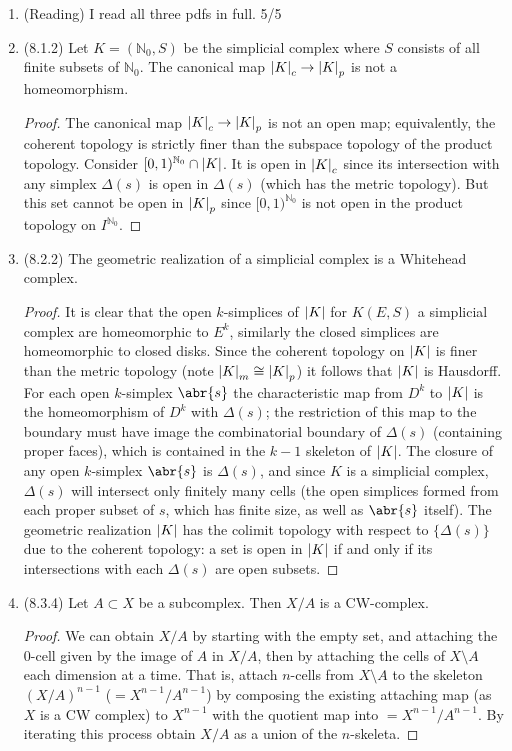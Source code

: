 \documentclass[11pt]{article}
\begin{document}
\begin{enumerate}
    \item (Reading) I read all three pdfs in full. 5/5
    \item (8.1.2) Let $K = (\mathbb{N}_0, S)$ be the simplicial complex where $S$ consists of all finite subsets of $\mathbb{N}_0$. The canonical map $\abs{K}_c\to \abs{K}_p$ is not a homeomorphism. \begin{proof}
      The canonical map $\abs{K}_c\to \abs{K}_p$ is not an open map; equivalently, the coherent topology is strictly finer than the subspace topology of the product topology. Consider $[0,1)^{\mathbb{N}_0}\cap\abs{K}$. It is open in $\abs{K}_c$ since its intersection with any simplex $\Delta(s)$ is open in $\Delta(s)$ (which has the metric topology). But this set cannot be open in $\abs{K}_p$ since $[0,1)^{\mathbb{N}_0}$ is not open in the product topology on $I^{\mathbb{N}_0}$.
    \end{proof}
    \item (8.2.2) The geometric realization of a simplicial complex is a Whitehead complex. \begin{proof}
      It is clear that the open $k$-simplices of $\abs{K}$ for $K(E,S)$ a simplicial complex are homeomorphic to $E^k$, similarly the closed simplices are homeomorphic to closed disks. Since the coherent topology on $\abs{K}$ is finer than the metric topology (note $\abs{K}_m\cong \abs{K}_p$) it follows that $\abs{K}$ is Hausdorff. For each open $k$-simplex $\abr{s}$ the characteristic map from $D^k$ to $\abs{K}$ is the homeomorphism of $D^k$ with $\Delta(s)$; the restriction of this map to the boundary must have image the combinatorial boundary of $\Delta(s)$ (containing proper faces), which is contained in the $k-1$ skeleton of $\abs{K}$. The closure of any open $k$-simplex $\abr{s}$ is $\Delta(s)$, and since $K$ is a simplicial complex, $\Delta(s)$ will intersect only finitely many cells (the open simplices formed from each proper subset of $s$, which has finite size, as well as $\abr{s}$ itself). The geometric realization $\abs{K}$ has the colimit topology with respect to $\{\Delta(s)\}$ due to the coherent topology: a set is open in $\abs{K}$ if and only if its intersections with each $\Delta(s)$ are open subsets.
    \end{proof}
    \item (8.3.4) Let $A\subset X$ be a subcomplex. Then $X/A$ is a CW-complex. \begin{proof}
      We can obtain $X/A$ by starting with the empty set, and attaching the $0$-cell given by the image of $A$ in $X/A$, then by attaching the cells of $X\setminus A$ each dimension at a time. That is, attach $n$-cells from $X\setminus A$ to the skeleton $(X/A)^{n-1}$ ($= X^{n-1}/A^{n-1}$) by composing the existing attaching map (as $X$ is a CW complex) to $X^{n-1}$ with the quotient map into $= X^{n-1}/A^{n-1}$. By iterating this process obtain $X/A$ as a union of the $n$-skeleta.
      

\end{proof}
\end{enumerate}
\end{document}
